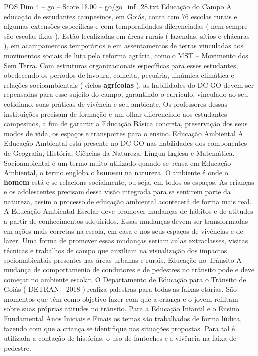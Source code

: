 \begin{textsample}{POS Dim 4 – go – Score 18.00 – go/go\_inf\_28.txt}
Educação do Campo A educação de estudantes campesinos, em Goiás, conta com 76 escolas rurais e algumas extensões específicas e com temporalidades diferenciadas ( nem sempre são escolas fixas ).
Estão localizadas em áreas rurais ( fazendas, sítios e chácaras ), em acampamentos temporários e em assentamentos de terras vinculadas aos movimentos sociais de luta pela reforma agrária, como o MST – Movimento dos Sem Terra.
Com estruturas organizacionais específicas para esses estudantes, obedecendo os períodos de lavoura, colheita, pecuária, dinâmica climática e relações socioambientais ( ciclos \textbf{agrícolas} ), as habilidades do DC-GO devem ser repensadas para esse sujeito do campo, garantindo o currículo, vinculado ao seu cotidiano, suas práticas de vivência e seu ambiente.
Os professores dessas instituições precisam de formação e um olhar diferenciado aos estudantes campesinos, a fim de garantir a Educação Básica concreta, preservação dos seus modos de vida, os espaços e transportes para o ensino.
Educação Ambiental A Educação Ambiental está presente no DC-GO nas habilidades dos componentes de Geografia, História, Ciências da Natureza, Língua Inglesa e Matemática.
Socioambiental é um termo muito utilizado quando se pensa em Educação Ambiental, o termo engloba o \textbf{homem} na natureza.
O ambiente é onde o \textbf{homem} está e se relaciona socialmente, ou seja, em todos os espaços.
As crianças e os adolescentes precisam dessa visão integrada para se sentirem parte da natureza, assim o processo de educação ambiental acontecerá de forma mais real.
A Educação Ambiental Escolar deve promover mudanças de hábitos e de atitudes a partir de conhecimentos adquiridos.
Essas mudanças devem ser transformadas em ações mais corretas na escola, em casa e nos seus espaços de vivências e de lazer.
Uma forma de promover essas mudanças seriam aulas extraclasses, visitas técnicas e trabalhos de campo que auxiliam na visualização dos impactos socioambientais presentes nas áreas urbanas e rurais.
Educação no Trânsito A mudança de comportamento de condutores e de pedestres no trânsito pode e deve começar no ambiente escolar.
O Departamento de Educação para o Trânsito de Goiás ( DETRAN - 2018 ) realiza palestras para todas as faixas etárias.
São momentos que têm como objetivo fazer com que a criança e o jovem reflitam sobre suas próprias atitudes no trânsito.
Para a Educação Infantil e o Ensino Fundamental Anos Iniciais e Finais os temas são trabalhados de forma lúdica, fazendo com que a criança se identifique nas situações propostas.
Para tal é utilizada a contação de histórias, o uso de fantoches e a vivência na faixa de pedestre.

\end{textsample}

